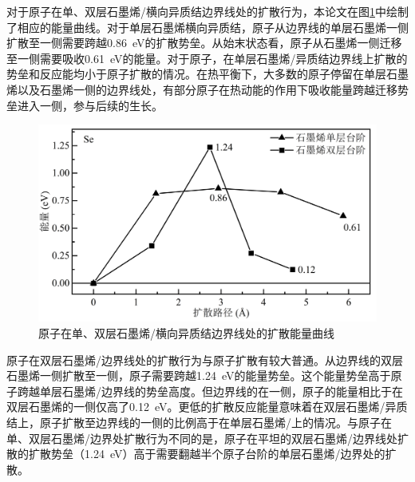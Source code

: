     对于原子在单、双层石墨烯/横向异质结边界线处的扩散行为，本论文在图\ref{fig:VS_DFT_NEB_Se_GtVSe}中绘制了相应的能量曲线。对于单层石墨烯横向异质结，原子从边界线的单层石墨烯一侧扩散至一侧需要跨越\SI{0.86}{\electronvolt}的扩散势垒。从始末状态看，原子从石墨烯一侧迁移至一侧需要吸收\SI{0.61}{\electronvolt}的能量。对于原子，在单层石墨烯/异质结边界线上扩散的势垒和反应能均小于原子扩散的情况。在热平衡下，大多数的原子停留在单层石墨烯以及石墨烯一侧的边界线处，有部分原子在热动能的作用下吸收能量跨越迁移势垒进入一侧，参与后续的生长。
    
    \begin{figure}[htb]
        \includegraphics{pic/VS_DFT_NEB_Se_GtVSe.png}
        \caption{原子在单、双层石墨烯/横向异质结边界线处的扩散能量曲线}
        \label{fig:VS_DFT_NEB_Se_GtVSe}
    \end{figure}

    原子在双层石墨烯/边界线处的扩散行为与原子扩散有较大普通。从边界线的双层石墨烯一侧扩散至一侧，原子需要跨越\SI{1.24}{\electronvolt}的能量势垒。这个能量势垒高于原子跨越单层石墨烯/边界线的势垒高度。但边界线的在一侧，原子的能量相比于在双层石墨烯的一侧仅高了\SI{0.12}{\electronvolt}。更低的扩散反应能量意味着在双层石墨烯/异质结上，原子扩散至边界线的一侧的比例高于在单层石墨烯/上的情况。与原子在单、双层石墨烯/边界处扩散行为不同的是，原子在平坦的双层石墨烯/边界线处扩散的扩散势垒（\SI{1.24}{\electronvolt}）高于需要翻越半个原子台阶的单层石墨烯/边界处的扩散。
    

